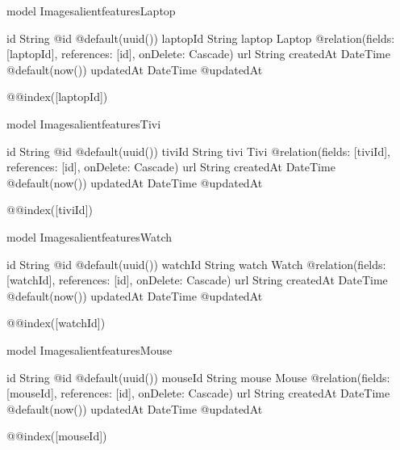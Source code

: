 model ImagesalientfeaturesLaptop {
  id        String   @id @default(uuid())
  laptopId  String
  laptop    Laptop   @relation(fields: [laptopId], references: [id], onDelete: Cascade)
  url       String
  createdAt DateTime @default(now())
  updatedAt DateTime @updatedAt

  @@index([laptopId])
}

model ImagesalientfeaturesTivi {
  id        String   @id @default(uuid())
  tiviId    String
  tivi      Tivi     @relation(fields: [tiviId], references: [id], onDelete: Cascade)
  url       String
  createdAt DateTime @default(now())
  updatedAt DateTime @updatedAt

  @@index([tiviId])
}

model ImagesalientfeaturesWatch {
  id        String   @id @default(uuid())
  watchId   String
  watch     Watch    @relation(fields: [watchId], references: [id], onDelete: Cascade)
  url       String
  createdAt DateTime @default(now())
  updatedAt DateTime @updatedAt

  @@index([watchId])
}

model ImagesalientfeaturesMouse {
  id        String   @id @default(uuid())
  mouseId   String
  mouse     Mouse    @relation(fields: [mouseId], references: [id], onDelete: Cascade)
  url       String
  createdAt DateTime @default(now())
  updatedAt DateTime @updatedAt

  @@index([mouseId])
}

